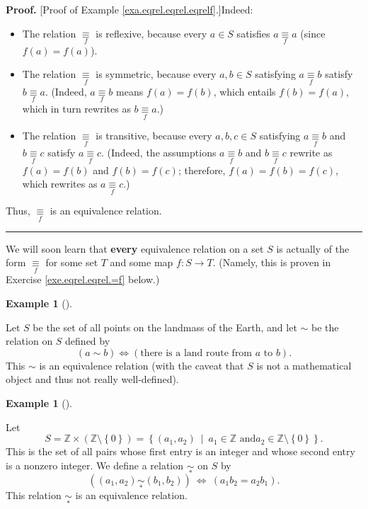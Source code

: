 \documentclass[numbers=enddot,12pt,final,onecolumn,notitlepage]{scrartcl}%
\numberwithin{exer}{subsection}
\theoremstyle{definition}
\newtheorem{exam}[theo]{Example}
\newenvironment{example}[1][]
{\begin{exam}[#1]\begin{leftbar}}
{\end{leftbar}\end{exam}}
\newenvironment{proof}[1][Proof]{\noindent\textbf{#1.} }{\ \rule{0.5em}{0.5em}}
\begin{document}
\begin{proof}
[Proof of Example \ref{exa.eqrel.eqrel.eqrelf}.]Indeed:

\begin{itemize}
\item The relation $\underset{f}{\equiv}$ is reflexive, because every $a\in S$
satisfies $a\underset{f}{\equiv}a$ (since $f\left(  a\right)  =f\left(
a\right)  $).

\item The relation $\underset{f}{\equiv}$ is symmetric, because every $a,b\in
S$ satisfying $a\underset{f}{\equiv}b$ satisfy $b\underset{f}{\equiv}a$.
(Indeed, $a\underset{f}{\equiv}b$ means $f\left(  a\right)  =f\left(
b\right)  $, which entails $f\left(  b\right)  =f\left(  a\right)  $, which in
turn rewrites as $b\underset{f}{\equiv}a$.)

\item The relation $\underset{f}{\equiv}$ is transitive, because every
$a,b,c\in S$ satisfying $a\underset{f}{\equiv}b$ and $b\underset{f}{\equiv}c$
satisfy $a\underset{f}{\equiv}c$. (Indeed, the assumptions
$a\underset{f}{\equiv}b$ and $b\underset{f}{\equiv}c$ rewrite as $f\left(
a\right)  =f\left(  b\right)  $ and $f\left(  b\right)  =f\left(  c\right)  $;
therefore, $f\left(  a\right)  =f\left(  b\right)  =f\left(  c\right)  $,
which rewrites as $a\underset{f}{\equiv}c$.)
\end{itemize}

\noindent Thus, $\underset{f}{\equiv}$ is an equivalence relation.
\end{proof}

We will soon learn that \textbf{every} equivalence relation on a set $S$ is
actually of the form $\underset{f}{\equiv}$ for some set $T$ and some map
$f:S\rightarrow T$. (Namely, this is proven in Exercise
\ref{exe.eqrel.eqrel.=f} below.)

\begin{example}
\label{exa.eqrel.eqrel.eqrel-continents}Let $S$ be the set of all points on
the landmass of the Earth, and let $\sim$ be the relation on $S$ defined by%
\[
\left(  a\sim b\right)  \Longleftrightarrow\left(  \text{there is a land route
from }a\text{ to }b\right)  .
\]
This $\sim$ is an equivalence relation (with the caveat that $S$ is not a
mathematical object and thus not really well-defined).
\end{example}

\begin{example}
\label{exa.eqrel.eqrel.eqrelQ}Let
\[
S=\mathbb{Z}\times\left(  \mathbb{Z}\setminus\left\{  0\right\}  \right)
=\left\{  \left(  a_{1},a_{2}\right)  \ \mid\ a_{1}\in\mathbb{Z}\text{ and
}a_{2}\in\mathbb{Z}\setminus\left\{  0\right\}  \right\}  .
\]
This is the set of all pairs whose first entry is an integer and whose second
entry is a nonzero integer. We define a relation $\underset{\ast}{\sim}$ on
$S$ by%
\[
\left(  \left(  a_{1},a_{2}\right)  \underset{\ast}{\sim}\left(  b_{1}%
,b_{2}\right)  \right)  \ \Longleftrightarrow\ \left(  a_{1}b_{2}=a_{2}%
b_{1}\right)  .
\]
This relation $\underset{\ast}{\sim}$ is an equivalence relation.
\end{example}
\end{document}
